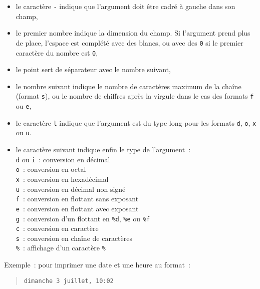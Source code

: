 \documentclass [twoside] {report}
\begin{document}
\begin {itemize}
    \item le caractère {\tt -} indique que l'argument doit être cadré à
	gauche dans son champ,

    \item le premier nombre indique la dimension du champ.  Si
	l'argument prend plus de place, l'espace est complété avec des
	blancs, ou avec des {\tt 0} si le premier caractère du nombre
	est {\tt 0},

    \item le point sert de séparateur avec le nombre suivant,

    \item le nombre suivant indique le nombre de caractères maximum de
	la chaîne (format {\tt s}), ou le nombre de chiffres après la
	virgule dans le cas des formats {\tt f} ou {\tt e},

    \item le caractère {\tt l} indique que l'argument est du type long
	pour les formats {\tt d}, {\tt o}, {\tt x} ou {\tt u}.

    \item le caractère suivant indique enfin le type de l'argument~:\\
	\texttt {d} ou \texttt {i}~: conversion en décimal\\
	\texttt {o}~: conversion en octal\\
	\texttt {x}~: conversion en hexadécimal\\
	\texttt {u}~: conversion en décimal non signé\\
	\texttt {f}~: conversion en flottant sans exposant\\
	\texttt {e}~: conversion en flottant avec exposant\\
	\texttt {g}~: conversion d'un flottant en {\tt \%d}, {\tt \%e} ou {\tt \%f}\\
	\texttt {c}~: conversion en caractère\\
	\texttt {s}~: conversion en chaîne de caractères\\
	\texttt {\%}~: affichage d'un caractère {\tt \%}

\end {itemize}

Exemple~: pour imprimer une date et une heure au format~: \par
\begin {quote}
\begin {verbatim}
dimanche 3 juillet, 10:02
\end{verbatim}
\end {quote}
\end{document}
